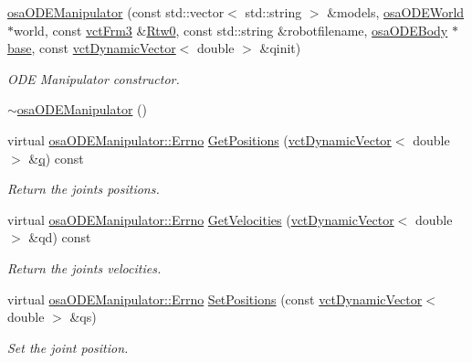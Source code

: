 \begin{DoxyCompactItemize}
\hyperlink{classosa_o_d_e_manipulator_a7eeebc7b152dde1b5964ef57e74d8241}{osa\-O\-D\-E\-Manipulator} (const std\-::vector$<$ std\-::string $>$ \&models, \hyperlink{classosa_o_d_e_world}{osa\-O\-D\-E\-World} $\ast$world, const \hyperlink{vct_transformation_types_8h_a81feda0a02c2d1bc26e5553f409fed20}{vct\-Frm3} \&\hyperlink{classrob_manipulator_ab48d9d9a166bf252698bc35788ca6ad6}{Rtw0}, const std\-::string \&robotfilename, \hyperlink{classosa_o_d_e_body}{osa\-O\-D\-E\-Body} $\ast$\hyperlink{classosa_o_s_g_manipulator_a6c69fd718f80ec8c73a408f01d2819ef}{base}, const \hyperlink{classvct_dynamic_vector}{vct\-Dynamic\-Vector}$<$ double $>$ \&qinit)
\begin{DoxyCompactList}\small\item\em O\-D\-E Manipulator constructor. \end{DoxyCompactList}\item 
\hyperlink{classosa_o_d_e_manipulator_a873fbd930715ca4f3bfcfb88369d0fd2}{$\sim$osa\-O\-D\-E\-Manipulator} ()
\item 
virtual \hyperlink{classrob_manipulator_a7bbb51cdb81c9c681075a9274ca0cdc0}{osa\-O\-D\-E\-Manipulator\-::\-Errno} \hyperlink{classosa_o_d_e_manipulator_a814f93a02207d689961149a0677161f5}{Get\-Positions} (\hyperlink{classvct_dynamic_vector}{vct\-Dynamic\-Vector}$<$ double $>$ \&\hyperlink{classosa_o_s_g_manipulator_a834ce7263dace4d925133753522abaa3}{q}) const 
\begin{DoxyCompactList}\small\item\em Return the joints positions. \end{DoxyCompactList}\item 
virtual \hyperlink{classrob_manipulator_a7bbb51cdb81c9c681075a9274ca0cdc0}{osa\-O\-D\-E\-Manipulator\-::\-Errno} \hyperlink{classosa_o_d_e_manipulator_a2682ef7b3c753bbfc5c04cde81a42f60}{Get\-Velocities} (\hyperlink{classvct_dynamic_vector}{vct\-Dynamic\-Vector}$<$ double $>$ \&qd) const 
\begin{DoxyCompactList}\small\item\em Return the joints velocities. \end{DoxyCompactList}\item 
virtual \hyperlink{classrob_manipulator_a7bbb51cdb81c9c681075a9274ca0cdc0}{osa\-O\-D\-E\-Manipulator\-::\-Errno} \hyperlink{classosa_o_d_e_manipulator_abf657b561796274ba82dc505517f225f}{Set\-Positions} (const \hyperlink{classvct_dynamic_vector}{vct\-Dynamic\-Vector}$<$ double $>$ \&qs)
\begin{DoxyCompactList}\small\item\em Set the joint position. \end{DoxyCompactList}\item 

\end{DoxyCompactItemize}

